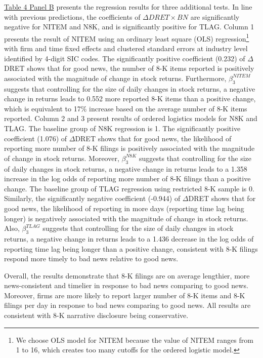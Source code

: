 \documentclass[a4paper]{article}
\begin{document}
\begin{spacing}{2}
\hyperref[T4PB]{Table 4 Panel B} presents the regression results for three additional tests. In line with previous predictions, the coefficients of $\Delta DRET\times BN$ are significantly negative for NITEM and N8K, and is significantly positive for TLAG. Column 1 presents the result of NITEM using an ordinary least square (OLS) regression\footnote{We choose OLS model for NITEM because the value of NITEM ranges from 1 to 16, which creates too many cutoffs for the ordered logistic model.} with firm and time fixed effects and clustered standard errors at industry level identified by 4-digit SIC codes. The significantly positive coefficient (0.232) of $\Delta$DRET shows that for good news, the number of 8-K items reported is positively associated with the magnitude of change in stock returns. Furthermore, $\beta_3^{NITEM}$ suggests that controlling for the size of daily changes in stock returns, a negative change in returns leads to 0.552 more reported 8-K items than a positive change, which is equivalent to 17\% increase based on the average number of 8-K items reported. Column 2 and 3 present results of ordered logistics models for N8K and TLAG. The baseline group of N8K regression is 1. The significantly positive coefficient (1.076) of $\Delta$DRET shows that for good news, the likelihood of reporting more number of 8-K filings is positively associated with the magnitude of change in stock returns. Moreover, $\beta_3^{N8K}$ suggests that controlling for the size of daily changes in stock returns, a negative change in returns leads to a 1.358 increase in the log odds of reporting more number of 8-K filings than a positive change. The baseline group of TLAG regression using restricted 8-K sample is 0. Similarly, the significantly negative coefficient (-0.944) of $\Delta$DRET shows that for good news, the likelihood of reporting in more days (reporting time lag being longer) is negatively associated with the magnitude of change in stock returns. Also, $\beta_3^{TLAG}$ suggests that controlling for the size of daily changes in stock returns, a negative change in returns leads to a 1.436 decrease in the log odds of reporting time lag being longer than a positive change, consistent with 8-K filings respond more timely to bad news relative to good news. 

Overall, the results demonstrate that 8-K filings are on average lengthier, more news-consistent and timelier in response to bad news comparing to good news. Moreover, firms are more likely to report larger number of 8-K items and 8-K filings per day in response to bad news comparing to good news. All results are consistent with 8-K narrative disclosure being conservative.


\end{spacing}
\end{document}
